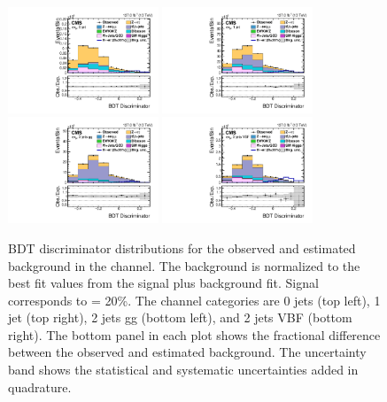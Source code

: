 \begin{figure}[htbp!]
  \centering
  \includegraphics[width=0.4\textwidth]{plots/chapter9/BDT/emu/0jet.pdf}
  \includegraphics[width=0.4\textwidth]{plots/chapter9/BDT/emu/1jet.pdf} \\
  \includegraphics[width=0.4\textwidth]{plots/chapter9/BDT/emu/2jet_gg.pdf}
  \includegraphics[width=0.4\textwidth]{plots/chapter9/BDT/emu/2jet_vbf.pdf} \\
  \caption{BDT discriminator distributions for the observed and estimated background in the \emu channel. The background is normalized to the best fit values from the signal plus background fit. Signal corresponds to \BHet = 20\%. The \emu channel categories are 0 jets (top left), 1 jet (top right), 2 jets gg (bottom left), and 2 jets VBF (bottom right). The bottom panel in each plot shows the fractional difference between the observed and estimated background. The uncertainty band shows the statistical and systematic uncertainties added in quadrature.}
  \label{fig:bdt_emu}
\end{figure}

